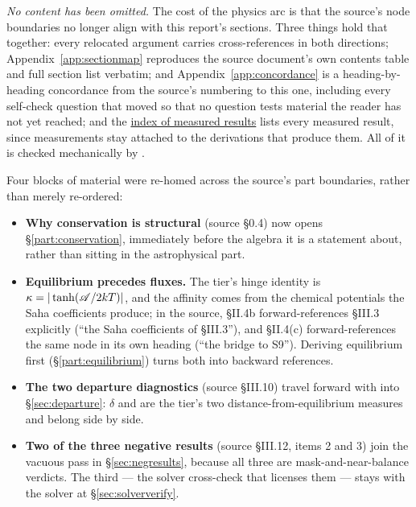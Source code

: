 \emph{No content has been omitted.} The cost of the physics arc is that the
source's node boundaries no longer align with this report's sections. Three
things hold that together: every relocated argument carries cross-references in
both directions; Appendix~\ref{app:sectionmap} reproduces the source document's
own contents table and full section list verbatim; and
Appendix~\ref{app:concordance} is a heading-by-heading concordance from the
source's numbering to this one, including every self-check question that moved
so that no question tests material the reader has not yet reached; and
the \hyperref[sec:resultsindex]{index of measured results} lists every measured result, since measurements stay
attached to the derivations that produce them. All of it is checked
mechanically by .

Four blocks of material were re-homed across the source's part boundaries,
rather than merely re-ordered:

\begin{itemize}
\item \textbf{Why conservation is structural} (source \S0.4) now opens
  \S\ref{part:conservation}, immediately before the algebra it is a statement
  about, rather than sitting in the astrophysical part.
\item \textbf{Equilibrium precedes fluxes.} The tier's hinge identity is
  $\kappa = |\tanh(\mathscr{A}/2kT)|$, and the affinity comes from the chemical
  potentials the Saha coefficients produce; in the source, \S II.4b
  forward-references \S III.3 explicitly (``the Saha coefficients of \S III.3''),
  and \S II.4(c) forward-references the same node in its own heading (``the
  bridge to S9''). Deriving equilibrium first (\S\ref{part:equilibrium}) turns
  both into backward references.
\item \textbf{The two departure diagnostics} (source \S III.10) travel forward
  with \kap{} into \S\ref{sec:departure}: $\delta$ and \kap{} are the tier's two
  distance-from-equilibrium measures and belong side by side.
\item \textbf{Two of the three negative results} (source \S III.12, items 2 and
  3) join the vacuous pass in \S\ref{sec:negresults}, because all three are
  mask-and-near-balance verdicts. The third --- the solver cross-check that
  licenses them --- stays with the solver at \S\ref{sec:solververify}.
\end{itemize}

